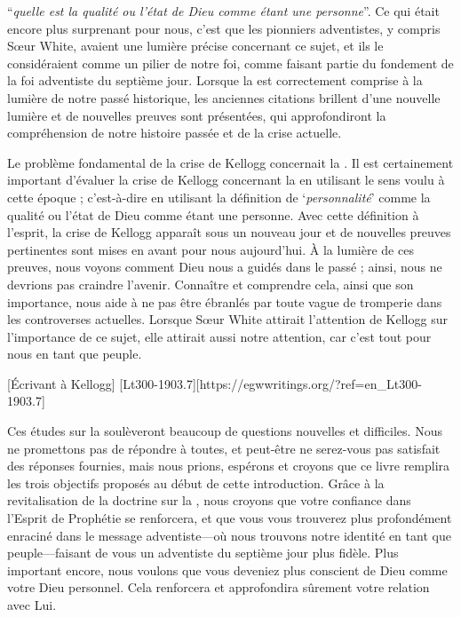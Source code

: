 “\textit{quelle est la qualité ou l'état de Dieu comme étant une personne}”. Ce qui était encore plus surprenant pour nous, c'est que les pionniers adventistes, y compris Sœur White, avaient une lumière précise concernant ce sujet, et ils le considéraient comme un pilier de notre foi, comme faisant partie du fondement de la foi adventiste du septième jour. Lorsque la  est correctement comprise à la lumière de notre passé historique, les anciennes citations brillent d'une nouvelle lumière et de nouvelles preuves sont présentées, qui approfondiront la compréhension de notre histoire passée et de la crise actuelle.

Le problème fondamental de la crise de Kellogg concernait la . Il est certainement important d'évaluer la crise de Kellogg concernant la  en utilisant le sens voulu à cette époque ; c'est-à-dire en utilisant la définition de ‘\textit{personnalité}’ comme la qualité ou l'état de Dieu comme étant une personne. Avec cette définition à l'esprit, la crise de Kellogg apparaît sous un nouveau jour et de nouvelles preuves pertinentes sont mises en avant pour nous aujourd'hui. À la lumière de ces preuves, nous voyons comment Dieu nous a guidés dans le passé ; ainsi, nous ne devrions pas craindre l'avenir. Connaître et comprendre cela, ainsi que son importance, nous aide à ne pas être ébranlés par toute vague de tromperie dans les controverses actuelles. Lorsque Sœur White attirait l'attention de Kellogg sur l'importance de ce sujet, elle attirait aussi notre attention, car c'est tout pour nous en tant que peuple.

[Écrivant à Kellogg] [Lt300-1903.7][https://egwwritings.org/?ref=en\_Lt300-1903.7]

Ces études sur la  soulèveront beaucoup de questions nouvelles et difficiles. Nous ne promettons pas de répondre à toutes, et peut-être ne serez-vous pas satisfait des réponses fournies, mais nous prions, espérons et croyons que ce livre remplira les trois objectifs proposés au début de cette introduction. Grâce à la revitalisation de la doctrine sur la , nous croyons que votre confiance dans l'Esprit de Prophétie se renforcera, et que vous vous trouverez plus profondément enraciné dans le message adventiste—où nous trouvons notre identité en tant que peuple—faisant de vous un adventiste du septième jour plus fidèle. Plus important encore, nous voulons que vous deveniez plus conscient de Dieu comme votre Dieu personnel. Cela renforcera et approfondira sûrement votre relation avec Lui.

